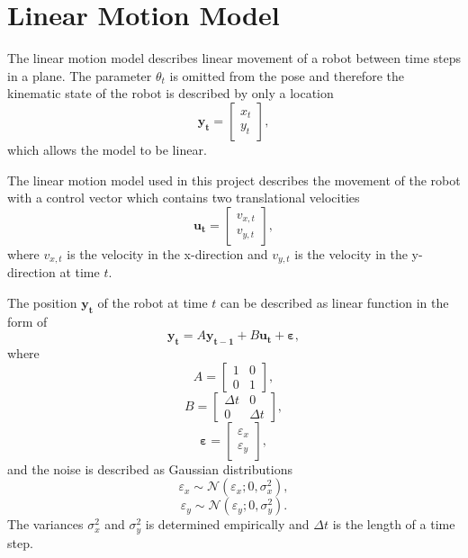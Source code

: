 \documentclass[12pt,oneside,openany,a4paper, %
afrikaans,english,
]{memoir}
\numberwithin{equation}{chapter}
\begin{document}
\section{Linear Motion Model}\label{linearmotionmodel}
The linear motion model describes linear movement of a robot between time steps in a plane. The parameter $\theta_t$ is omitted from the pose  and therefore the kinematic state of the robot is described by only a location
\begin{equation}
\bm{y_t} =
\begin{bmatrix}
x_t\\
y_t
\end{bmatrix},
\end{equation}
which allows the model to be linear.

The linear motion model used in this project describes the movement of the robot with a control vector which contains two translational velocities
\begin{equation}
\bm{u_t} = 
\begin{bmatrix}
v_{x,t}\\
v_{y,t}
\end{bmatrix},
\end{equation}
where $v_{x,t}$ is the velocity in the x-direction and $v_{y,t}$ is the velocity in the y-direction at time $t$.

The position $\bm{y_t}$ of the robot at time $t$ can be described as linear function in the form of
\begin{equation}\label{eq:lineartrans}
\bm{y_t} = A \bm{y_{t - 1}} + B \bm{u_t} + \bm{\varepsilon},
\end{equation}
where
\begin{equation}
A =
\begin{bmatrix}
1 & 0\\
0 & 1
\end{bmatrix},
\end{equation}
\begin{equation}
B = \begin{bmatrix}
\Delta t & 0\\
0 & \Delta t
\end{bmatrix},
\end{equation}
\begin{equation}
\bm{\varepsilon} =
\begin{bmatrix}
\varepsilon_x\\
\varepsilon_y
\end{bmatrix},
\end{equation}
and the noise is described as Gaussian distributions
\begin{equation}
\varepsilon_x \sim \mathcal{N}(\varepsilon_x; 0, \sigma_x^2),
\end{equation}
\begin{equation}
\varepsilon_y \sim \mathcal{N}(\varepsilon_y; 0, \sigma_y^2).
\end{equation}
The variances $\sigma_x^2$ and $\sigma_y^2$ is determined empirically and $\Delta t$ is the length of a time step.
\end{document}
